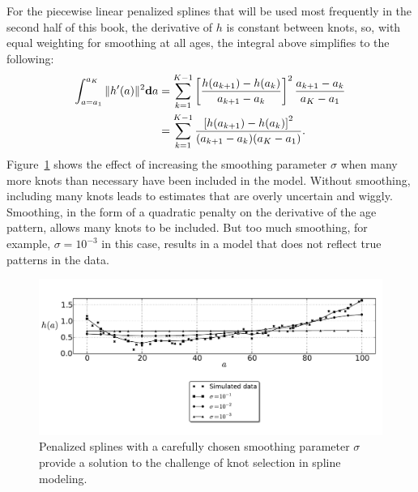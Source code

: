 For the piecewise linear penalized splines that will be used most
frequently in the second half of this book, the derivative of $h$ is
constant between knots, so, with equal weighting for smoothing at all
ages, the integral above simplifies to the following:
\begin{align*}
\int _{a=a_1} ^{a_K} \| h'(a) \|^2 \mathbf{d} a
& = \sum_{k=1} ^{K-1} \left[\frac{h(a_{k+1}) - h(a_k)}{a_{k+1}-a_k}\right]^2 \frac{a_{k+1}-a_k}{a_K - a_1}\\
&= \sum_{k=1} ^{K-1} \frac{\left[h(a_{k+1}) - h(a_k)\right]^2}{(a_{k+1}-a_k)(a_K - a_1)}.
\end{align*}
Figure~\ref{smoothing-splines} shows the effect of increasing the
smoothing parameter $\sigma$ when many more knots than necessary have been included in the model.
  Without smoothing, including many knots leads to
  estimates that are overly uncertain and wiggly.  Smoothing, in the
  form of a quadratic penalty on the derivative of the age pattern,
  allows many knots to be included.  But too much smoothing, for
  example, $\sigma=10^{-3}$ in this case, results in a model that does
  not reflect true patterns in the data.

\begin{figure}[h]
\begin{center}
\includegraphics[width=\textwidth]{smoothing-splines.pdf}
\caption[Penalized splines with a carefully chosen smoothing
  parameter.]{Penalized splines with a carefully chosen smoothing parameter
  $\sigma$ provide a solution to the challenge of knot selection in
  spline modeling.}
\label{smoothing-splines}
\end{center}
\end{figure}


